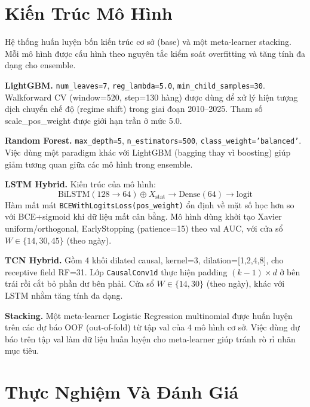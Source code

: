 \documentclass[conference]{IEEEtran}
\begin{document}
\section{Kiến Trúc Mô Hình}

Hệ thống huấn luyện bốn kiến trúc cơ sở (base) và một meta-learner stacking.
Mỗi mô hình được cấu hình theo nguyên tắc kiểm soát overfitting và tăng tính
đa dạng cho ensemble.

\textbf{LightGBM.} \texttt{num\_leaves=7}, \texttt{reg\_lambda=5.0},
\texttt{min\_child\_samples=30}. Walkforward CV (window=520, step=130 hàng)
được dùng để xử lý hiện tượng dịch chuyển chế độ (regime shift) trong giai
đoạn 2010--2025. Tham số scale\_pos\_weight được giới hạn trần ở mức 5.0.

\textbf{Random Forest.} \texttt{max\_depth=5}, \texttt{n\_estimators=500},
\texttt{class\_weight='balanced'}. Việc dùng một paradigm khác với LightGBM
(bagging thay vì boosting) giúp giảm tương quan giữa các mô hình trong
ensemble.

\textbf{LSTM Hybrid.} Kiến trúc của mô hình:
\begin{equation}
\text{BiLSTM}(128{\to}64) \oplus X_\text{stat}
\to \text{Dense}(64) \to \text{logit}
\label{eq:lstm}
\end{equation}
Hàm mất mát \texttt{BCEWithLogitsLoss(pos\_weight)} ổn định về mặt số học hơn
so với BCE+sigmoid khi dữ liệu mất cân bằng. Mô hình dùng khởi tạo Xavier
uniform/orthogonal, EarlyStopping (patience=15) theo val AUC, với cửa sổ
$W \in \{14,30,45\}$ (theo ngày).

\textbf{TCN Hybrid.} Gồm 4 khối dilated causal, kernel=3,
dilation=[1,2,4,8], cho receptive field RF=31. Lớp \texttt{CausalConv1d} thực
hiện padding $(k{-}1){\times}d$ ở bên trái rồi cắt bỏ phần dư bên phải. Cửa
sổ $W \in \{14,30\}$ (theo ngày), khác với LSTM nhằm tăng tính đa dạng.

\textbf{Stacking.} Một meta-learner Logistic Regression multinomial được huấn
luyện trên các dự báo OOF (out-of-fold) từ tập val của 4 mô hình cơ sở. Việc
dùng dự báo trên tập val làm dữ liệu huấn luyện cho meta-learner giúp tránh
rò rỉ nhãn mục tiêu.

\section{Thực Nghiệm Và Đánh Giá}
\end{document}
